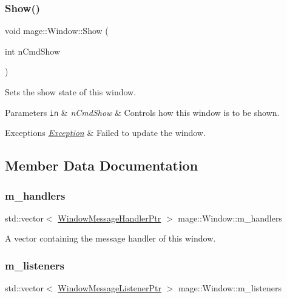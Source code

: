 \subsubsection{\texorpdfstring{Show()}{Show()}}
{\footnotesize\ttfamily void mage\+::\+Window\+::\+Show (\begin{DoxyParamCaption}\item[{int}]{n\+Cmd\+Show }\end{DoxyParamCaption})}

Sets the show state of this window.


\begin{DoxyParams}[1]{Parameters}
\mbox{\tt in}  & {\em n\+Cmd\+Show} & Controls how this window is to be shown. \\
\hline
\end{DoxyParams}

\begin{DoxyExceptions}{Exceptions}
{\em \mbox{\hyperlink{classmage_1_1_exception}{Exception}}} & Failed to update the window. \\
\hline
\end{DoxyExceptions}


\subsection{Member Data Documentation}
\mbox{\label{classmage_1_1_window_a7438964a7b8c196d84da24cf789e5bd9}} 
\subsubsection{\texorpdfstring{m\+\_\+handlers}{m\_handlers}}
{\footnotesize\ttfamily std\+::vector$<$ \mbox{\hyperlink{classmage_1_1_window_add1d792fb9f71e70d4fb07409d80cfdd}{Window\+Message\+Handler\+Ptr}} $>$ mage\+::\+Window\+::m\+\_\+handlers\hspace{0.3cm}{\ttfamily [private]}}

A vector containing the message handler of this window. \mbox{\label{classmage_1_1_window_a28aab68439dc39058a7e507b0cd8c60b}} 
\subsubsection{\texorpdfstring{m\+\_\+listeners}{m\_listeners}}
{\footnotesize\ttfamily std\+::vector$<$ \mbox{\hyperlink{classmage_1_1_window_a0e0a4f2a3f6db176f6aec454b94a06fb}{Window\+Message\+Listener\+Ptr}} $>$ mage\+::\+Window\+::m\+\_\+listeners\hspace{0.3cm}{\ttfamily [private]}}

